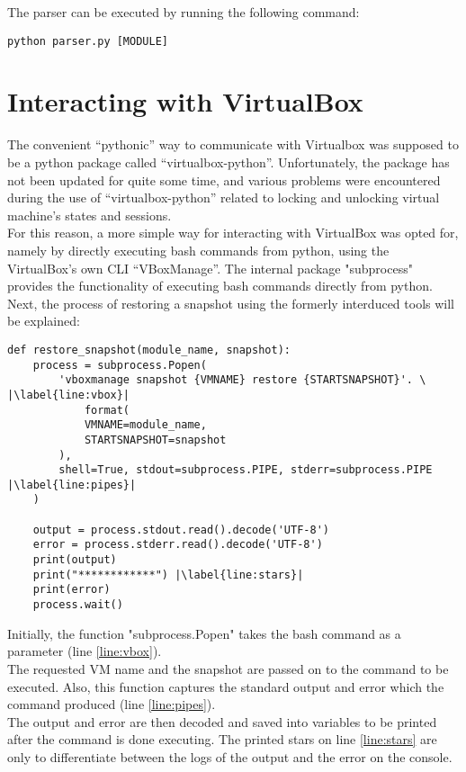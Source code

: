 The parser can be executed by running the following command:\\
\begin{lstlisting}[caption=Parser command, style=pythonstyle]
python parser.py [MODULE]
\end{lstlisting}


\section{Interacting with VirtualBox}
The convenient “pythonic” way to communicate with Virtualbox was supposed to be a python package called “virtualbox-python”\cite{sethmlarson}. Unfortunately, the package has not been updated for quite some time, and various problems were encountered during the use of “virtualbox-python” related to locking and unlocking virtual machine’s states and sessions.\\
For this reason, a more simple way for interacting with VirtualBox was opted for, namely by directly executing bash commands from python, using the VirtualBox’s own CLI “VBoxManage”\cite{vboxmanage}. The internal package "subprocess"\cite{subprocess} provides the functionality of executing bash commands directly from python.
Next, the process of restoring a snapshot using the formerly interduced tools will be explained:
\begin{lstlisting}[caption=Restore snapshot, style=pythonstyle, escapechar=|]
def restore_snapshot(module_name, snapshot):
    process = subprocess.Popen(
        'vboxmanage snapshot {VMNAME} restore {STARTSNAPSHOT}'. \ |\label{line:vbox}|
            format(
            VMNAME=module_name,
            STARTSNAPSHOT=snapshot
        ),
        shell=True, stdout=subprocess.PIPE, stderr=subprocess.PIPE |\label{line:pipes}|
    )

    output = process.stdout.read().decode('UTF-8')
    error = process.stderr.read().decode('UTF-8')
    print(output)
    print("************") |\label{line:stars}|
    print(error)
    process.wait()
\end{lstlisting}

Initially, the function "subprocess.Popen" takes the bash command as a parameter (line \ref{line:vbox}).\\
The requested VM name and the snapshot are passed on to the command to be executed.
Also, this function captures the standard output and error which the command produced (line \ref{line:pipes}).\\
The output and error are then decoded and saved into variables to be printed after the command is done executing. The printed stars on line \ref{line:stars} are only to differentiate between the logs of the output and the error on the console.


